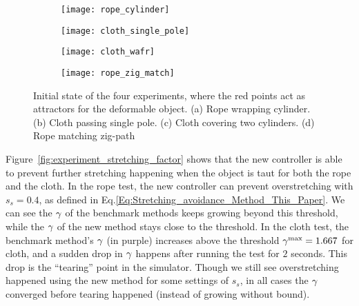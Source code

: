 \begin{figure}[h]
    \centering
    \begin{subfigure}{0.248\textwidth}
        \centering
        \texttt{[image: rope\_cylinder]}%
        \caption{}
    \end{subfigure}\hfill
    \begin{subfigure}{0.248\textwidth}
        \centering
        \texttt{[image: cloth\_single\_pole]}%
        \caption{}
    \end{subfigure}\hfill
    \begin{subfigure}{0.248\textwidth}
        \centering
        \texttt{[image: cloth\_wafr]}%
        \caption{}
    \end{subfigure}\hfill
    \begin{subfigure}{0.248\textwidth}
        \centering
        \texttt{[image: rope\_zig\_match]}%
        \caption{}
    \end{subfigure}%
    \caption{Initial state of the four experiments, where the red points act as attractors for the deformable object. (a) Rope wrapping cylinder. (b) Cloth passing single pole. (c) Cloth covering two cylinders. (d) Rope matching zig-path}
    \label{fig:experimental_setup_scene}
\end{figure}

Figure~\ref{fig:experiment_stretching_factor} shows that the new controller is able to prevent further stretching happening when the object is taut for both the rope and the cloth. In the rope test, the new controller can prevent overstretching with $s_s = 0.4$, as defined in Eq.\ref{Eq:Stretching_avoidance_Method_This_Paper}. We can see the $\gamma$ of the benchmark methods keeps growing beyond this threshold, while the $\gamma$ of the new method stays close to the threshold. In the cloth test, the benchmark method's $\gamma$ (in purple) increases above the threshold $\gamma^{\textrm{max}} = 1.667$ for cloth, and a sudden drop in $\gamma$ happens after running the test for $2$ seconds. This drop is the ``tearing'' point in the simulator. Though we still see overstretching happened using the new method for some settings of $s_s$, in all cases the $\gamma$ converged before tearing happened (instead of growing without bound). 

